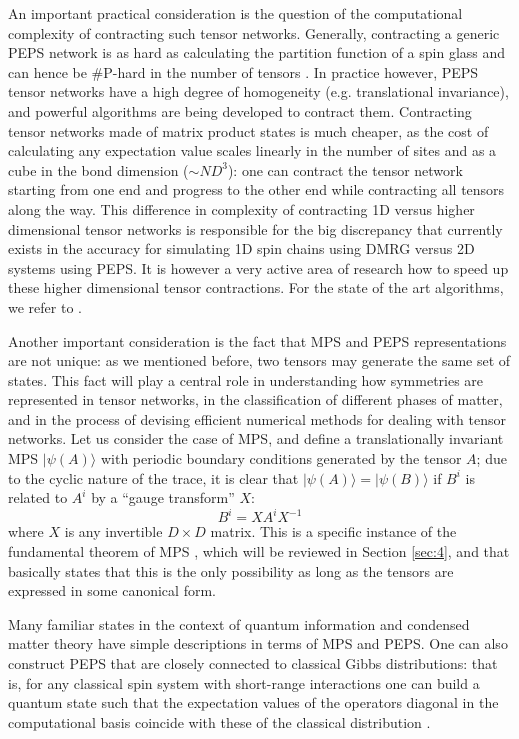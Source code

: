 \documentclass[rmp,aps,reprint,superscriptaddress,nobalancelastpage]{revtex4-1}
\newcommand{\be}{\begin{equation}}
\newcommand{\ee}{\end{equation}}
\begin{document}
An important practical consideration is the question of the computational complexity of contracting such tensor networks.
Generally, contracting a generic PEPS network is as hard as calculating the partition function of a spin glass and can hence be \textsf{\#P}-hard in the number of tensors \cite{verstraete:comp-power-of-peps,schuch:cplx-of-PEPS,haferkamp:cplx-of-avg-contraction}. In practice however, PEPS tensor networks have a high degree of homogeneity (e.g. translational invariance), and powerful algorithms are being developed to contract them.  Contracting tensor networks made of  matrix product states is much cheaper, as the cost of calculating any expectation value scales linearly in the number of sites and as a cube in the bond dimension ($\sim ND^3$): one can contract the tensor network starting from one end and progress to the other end while contracting all tensors along the way. This difference in complexity of contracting 1D versus higher dimensional tensor networks is responsible for the big discrepancy that currently exists in the accuracy for simulating 1D spin chains using DMRG versus 2D systems using PEPS.  It is however a very active area of research how to speed up these higher dimensional tensor contractions. For the state of the art algorithms, we refer to .

Another important consideration is the fact that MPS and PEPS representations are not unique: as we mentioned before, two tensors may generate the same set of states. This fact will play a central role in understanding how symmetries are represented in tensor networks, in the classification of different phases of matter, and in the process of devising efficient numerical methods for dealing with tensor networks.  Let us consider the case of MPS, and define a translationally invariant MPS $|\psi(A)\rangle$ with periodic boundary conditions generated by the tensor $A$; due to the cyclic nature of the trace, it is clear that $|\psi(A)\rangle=|\psi(B)\rangle$ if $B^i$ is related to $A^i$ by a ``gauge transform'' $X$:
\be
    \label{PullCondMPS}
    B^i=XA^iX^{-1}
\ee
where $X$ is any invertible $D\times D$ matrix. This is a specific instance of the fundamental theorem of MPS \cite{perez-garcia:mps-reps, perez-garcia:stringorder-1d}, which will be reviewed in Section \ref{sec:4}, and that basically states that this is the only possibility as long as the tensors are expressed in some canonical form.

Many familiar states in the context of quantum information and condensed matter theory have simple descriptions in terms of MPS and PEPS. One can also construct PEPS that are closely connected to classical Gibbs distributions: that is, for any classical spin system with short-range interactions one can build a quantum state such that the expectation values of the operators diagonal in the computational basis coincide with these of the classical distribution \cite{verstraete:comp-power-of-peps}.
\end{document}
